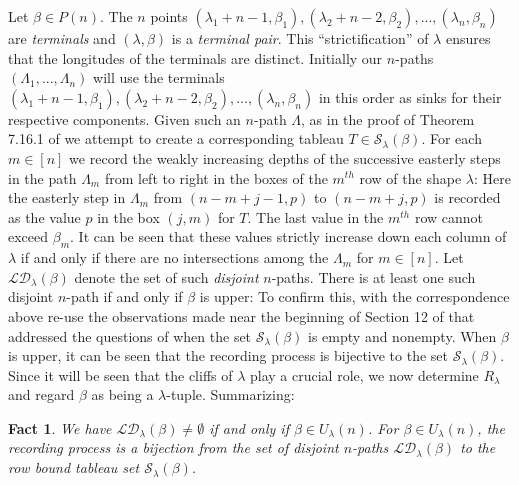 \documentclass[11pt]{article}
\newtheorem{fact}[thm]{Fact}
\theoremstyle{definition}
\theoremstyle{remark}
\numberwithin{equation}{section}
\begin{document}
\begin{spacing}{1.35}
Let $\beta \in P(n)$.  The $n$ points $(\lambda_1+n-1, \beta_1), (\lambda_2+n-2, \beta_2),... ,(\lambda_n,\beta_n)$ are \emph{terminals} and $(\lambda, \beta)$ is a \emph{terminal pair}.  This ``strictification'' of $\lambda$ ensures that the longitudes of the terminals are distinct.  Initially our $n$-paths $(\Lambda_1, ..., \Lambda_n)$ will use the terminals $(\lambda_1+n-1, \beta_1), (\lambda_2+n-2,\beta_2), ... , (\lambda_n, \beta_n)$ in this order as sinks for their respective components.  Given such an $n$-path $\Lambda$, as in the proof of Theorem 7.16.1 of \cite{St2} we attempt to create a corresponding tableau $T \in \mathcal{S}_\lambda(\beta)$.  For each $m \in [n]$ we record the weakly increasing depths of the successive easterly steps in the path $\Lambda_m$ from left to right in the boxes of the $m^{th}$ row of the shape $\lambda$:  Here the easterly step in $\Lambda_m$ from $(n-m+j-1,p)$ to $(n-m+j,p)$ is recorded as the value $p$ in the box $(j,m)$ for $T$.  The last value in the $m^{th}$ row cannot exceed $\beta_m$.  It can be seen that these values strictly increase down each column of $\lambda$ if and only if there are no intersections among the $\Lambda_m$ for $m \in [n]$.  Let $\mathcal{LD}_\lambda(\beta)$ denote the set of such \emph{disjoint} $n$-paths.  There is at least one such disjoint $n$-path if and only if $\beta$ is upper:  To confirm this, with the correspondence above re-use the observations made near the beginning of Section 12 of \cite{PW} that addressed the questions of when the set $\mathcal{S}_\lambda(\beta)$ is empty and nonempty.  When $\beta$ is upper, it can be seen that the recording process is bijective to the set $\mathcal{S}_\lambda(\beta)$.  Since it will be seen that the cliffs of $\lambda$ play a crucial role, we now determine $R_\lambda$ and regard $\beta$ as being a $\lambda$-tuple.  Summarizing:

\begin{fact}\label{fact315.5}We have $\mathcal{LD}_\lambda(\beta) \neq \emptyset$ if and only if $\beta \in U_\lambda(n)$.  For $\beta \in U_\lambda(n)$, the recording process is a bijection from the set of disjoint $n$-paths $\mathcal{LD}_\lambda(\beta)$ to the row bound tableau set $\mathcal{S}_\lambda(\beta)$.  \end{fact}





\end{spacing}
\end{document}
